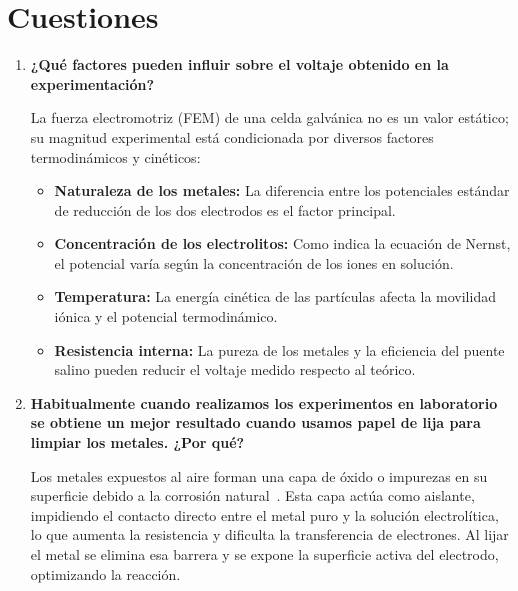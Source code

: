\documentclass[12pt]{article}
\begin{document}
\section{Cuestiones}

\begin{enumerate}[label=\textbf{P\arabic*.}, leftmargin=1.2cm]

    \item \textbf{¿Qué factores pueden influir sobre el voltaje obtenido en la
          experimentación?}

    La fuerza electromotriz (FEM) de una celda galvánica no es un valor
    estático; su magnitud experimental está condicionada por diversos factores
    termodinámicos y cinéticos:

    \begin{itemize}[leftmargin=1cm]
        \item \textbf{Naturaleza de los metales:} La diferencia entre los
              potenciales estándar de reducción de los dos electrodos es el
              factor principal.
        \item \textbf{Concentración de los electrolitos:} Como indica la
              ecuación de Nernst, el potencial varía según la concentración
              de los iones en solución.
        \item \textbf{Temperatura:} La energía cinética de las partículas
              afecta la movilidad iónica y el potencial termodinámico.
        \item \textbf{Resistencia interna:} La pureza de los metales y la
              eficiencia del puente salino pueden reducir el voltaje medido
              respecto al teórico.
    \end{itemize}

    \item \textbf{Habitualmente cuando realizamos los experimentos en
          laboratorio se obtiene un mejor resultado cuando usamos papel de
          lija para limpiar los metales. ¿Por qué?}

    Los metales expuestos al aire forman una capa de óxido o impurezas en su
    superficie debido a la corrosión natural~\cite{brown2014}. Esta capa actúa
    como aislante, impidiendo el contacto directo entre el metal puro y la
    solución electrolítica, lo que aumenta la resistencia y dificulta la
    transferencia de electrones. Al lijar el metal se elimina esa barrera y se
    expone la superficie activa del electrodo, optimizando la reacción.


\end{enumerate}
\end{document}
